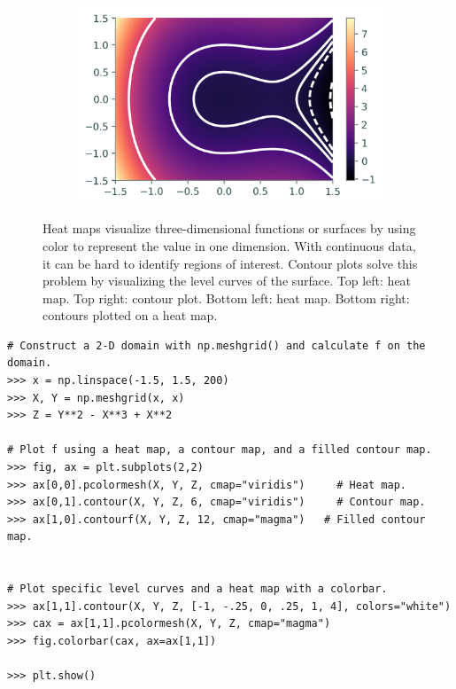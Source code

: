 \begin{figure}[H]
\begin{subfigure}{.495\textwidth}
    \end{subfigure}
    \begin{subfigure}{.495\textwidth}
        \centering
        \includegraphics[width=\textwidth]{figures/heatmap_2.png}
    \end{subfigure}
    \caption{Heat maps visualize three-dimensional functions or surfaces by using color to represent the value in one dimension. With continuous data, it can be hard to identify regions of interest. Contour plots solve this problem by visualizing the level curves of the surface. Top left: heat map. Top right: contour plot. Bottom left: heat map. Bottom right: contours plotted on a heat map.}
    \label{fig:heatcontour}
\end{figure}

\begin{lstlisting}
# Construct a 2-D domain with np.meshgrid() and calculate f on the domain.
>>> x = np.linspace(-1.5, 1.5, 200)
>>> X, Y = np.meshgrid(x, x)
>>> Z = Y**2 - X**3 + X**2

# Plot f using a heat map, a contour map, and a filled contour map.
>>> fig, ax = plt.subplots(2,2)
>>> ax[0,0].pcolormesh(X, Y, Z, cmap="viridis")     # Heat map.
>>> ax[0,1].contour(X, Y, Z, 6, cmap="viridis")     # Contour map.
>>> ax[1,0].contourf(X, Y, Z, 12, cmap="magma")   # Filled contour map.


# Plot specific level curves and a heat map with a colorbar.
>>> ax[1,1].contour(X, Y, Z, [-1, -.25, 0, .25, 1, 4], colors="white")
>>> cax = ax[1,1].pcolormesh(X, Y, Z, cmap="magma")
>>> fig.colorbar(cax, ax=ax[1,1])

>>> plt.show()
\end{lstlisting}

